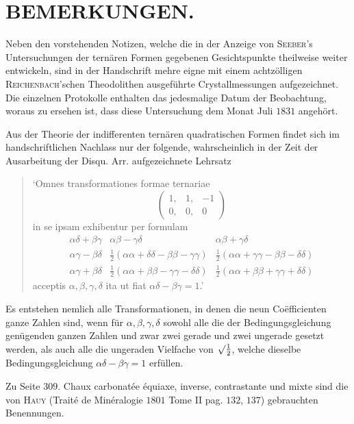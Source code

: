\section*{BEMERKUNGEN.}
Neben den vorstehenden Notizen, welche die in der Anzeige von \textsc{Seeber}'s Untersuchungen der ternären Formen gegebenen Gesichtspunkte theilweise weiter entwickeln, sind in der Handschrift mehre eigne mit einem achtzölligen \textsc{Reichenbach}'schen Theodolithen ausgeführte Crystallmessungen aufgezeichnet. Die einzelnen Protokolle enthalten das jedesmalige Datum der Beobachtung, woraus zu ersehen ist, dass diese Untersuchung dem Monat Juli $1831$ angehört.

Aus der Theorie der indifferenten ternären quadratischen Formen findet sich im handschriftlichen Nachlass nur der folgende, wahrscheinlich in der Zeit der Ausarbeitung der Disqu. Arr. aufgezeichnete Lehrsatz
\begin{quote}
‘Omnes transformationes formae ternariae
\[
\left(\begin{smallmatrix}1,&1,&-1\\0,&0,&0\end{smallmatrix}\right)
\]
in se ipsam exhibentur per formulam
\[
\begin{array}{ccc}
\alpha\delta+\beta\gamma&\alpha\beta-\gamma\delta&\alpha\beta+\gamma\delta\\[.5ex]
\alpha\gamma-\beta\delta&\frac12(\alpha\alpha+\delta\delta-\beta\beta-\gamma\gamma)&\frac12(\alpha\alpha+\gamma\gamma-\beta\beta-\delta\delta)\\[.5ex]
\alpha\gamma+\beta\delta&\frac12(\alpha\alpha+\beta\beta-\gamma\gamma-\delta\delta)&\frac12(\alpha\alpha+\beta\beta+\gamma\gamma+\delta\delta)
\end{array}
\]
acceptis $\alpha,\beta,\gamma,\delta$ ita ut fiat $\alpha\delta-\beta\gamma=1$.’
\end{quote}

Es entstehen nemlich alle Transformationen, in denen die neun Coëfficienten ganze Zahlen sind, wenn für $\alpha,\beta,\gamma,\delta$ sowohl alle die der Bedingungsgleichung genügenden ganzen Zahlen und zwar zwei gerade und zwei ungerade gesetzt werden, als auch alle die ungeraden Vielfache von $\surd\frac12$, welche dieselbe Bedingungsgleichung $\alpha\delta-\beta\gamma=1$ erfüllen.

Zu Seite $309$. Chaux carbonatée équiaxe, inverse, contrastante und mixte sind die von \textsc{Hauy} (Traité de Minéralogie $1801$ Tome II pag. $132$, $137$) gebrauchten Benennungen.

